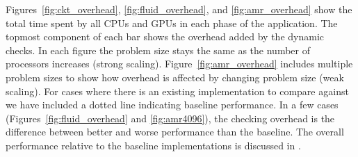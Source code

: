 Figures~\ref{fig:ckt_overhead}, \ref{fig:fluid_overhead}, and \ref{fig:amr_overhead} show 
the total time spent by all CPUs and GPUs in each phase of the application.  The topmost
component of each bar shows the overhead added by the dynamic checks.  In 
each figure the problem size stays the same as the number of processors increases
(strong scaling).  Figure~\ref{fig:amr_overhead} includes multiple problem sizes to show
how overhead is affected by changing problem size (weak scaling).  For cases where there
is an existing implementation to compare against we have included a dotted line indicating
baseline performance.  In a few cases (Figures~\ref{fig:fluid_overhead} and 
\ref{fig:amr4096}), the checking overhead is the difference
between better and worse performance than the baseline.  The overall
performance relative to the baseline implementations is discussed in \cite{Legion12}.

